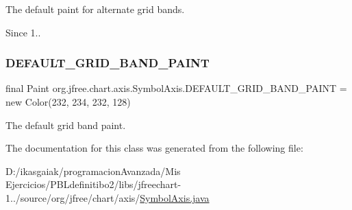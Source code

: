 The default paint for alternate grid bands.

\begin{DoxySince}{Since}
1.. 
\end{DoxySince}
\mbox{\label{classorg_1_1jfree_1_1chart_1_1axis_1_1_symbol_axis_ac441cbd985b5f34d86bd8419ab8dc6d0}} 
\subsubsection{\texorpdfstring{D\+E\+F\+A\+U\+L\+T\+\_\+\+G\+R\+I\+D\+\_\+\+B\+A\+N\+D\+\_\+\+P\+A\+I\+NT}{DEFAULT\_GRID\_BAND\_PAINT}}
{\footnotesize\ttfamily final Paint org.\+jfree.\+chart.\+axis.\+Symbol\+Axis.\+D\+E\+F\+A\+U\+L\+T\+\_\+\+G\+R\+I\+D\+\_\+\+B\+A\+N\+D\+\_\+\+P\+A\+I\+NT = new Color(232, 234, 232, 128)\hspace{0.3cm}{\ttfamily [static]}}

The default grid band paint. 

The documentation for this class was generated from the following file\+:\begin{DoxyCompactItemize}
\item 
D\+:/ikasgaiak/programacion\+Avanzada/\+Mis Ejercicios/\+P\+B\+Ldefinitibo2/libs/jfreechart-\/1../source/org/jfree/chart/axis/\mbox{\hyperlink{_symbol_axis_8java}{Symbol\+Axis.\+java}}\end{DoxyCompactItemize}
